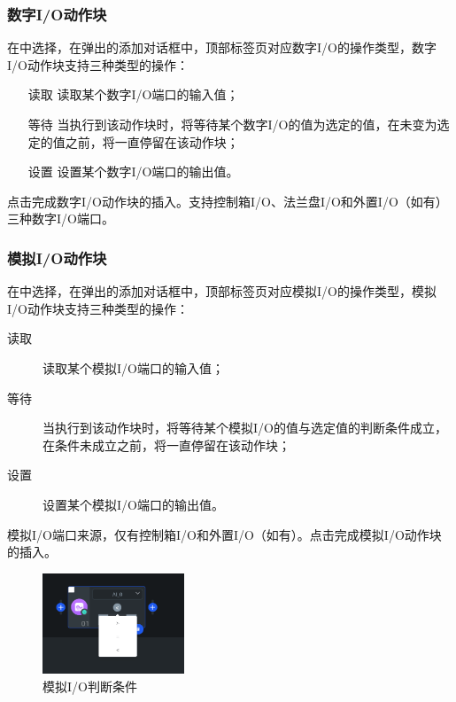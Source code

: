 \subsubsection{数字I/O动作块}
在中选择，在弹出的添加对话框中，顶部标签页对应数字I/O的操作类型，数字I/O动作块支持三种类型的操作：
\begin{itemize}
\item[读取] 读取某个数字I/O端口的输入值；
\item[等待] 当执行到该动作块时，将等待某个数字I/O的值为选定的值，在未变为选定的值之前，将一直停留在该动作块；
\item[设置] 设置某个数字I/O端口的输出值。
\end{itemize}

点击完成数字I/O动作块的插入。支持控制箱I/O、法兰盘I/O和外置I/O（如有）三种数字I/O端口。



\subsubsection{模拟I/O动作块}
在中选择，在弹出的添加对话框中，顶部标签页对应模拟I/O的操作类型，模拟I/O动作块支持三种类型的操作：
\begin{description}
\item[读取] 读取某个模拟I/O端口的输入值；
\item[等待] 当执行到该动作块时，将等待某个模拟I/O的值与选定值的判断条件成立，在条件未成立之前，将一直停留在该动作块；
\item[设置] 设置某个模拟I/O端口的输出值。
\end{description}


模拟I/O端口来源，仅有控制箱I/O和外置I/O（如有）。点击完成模拟I/O动作块的插入。

\begin{figure}[ht]
	\centering
	\includegraphics[height=3cm]{screen/3-13.png}
	\caption{模拟I/O判断条件}
	\label{fig:模拟IO判断条件}
\end{figure}

